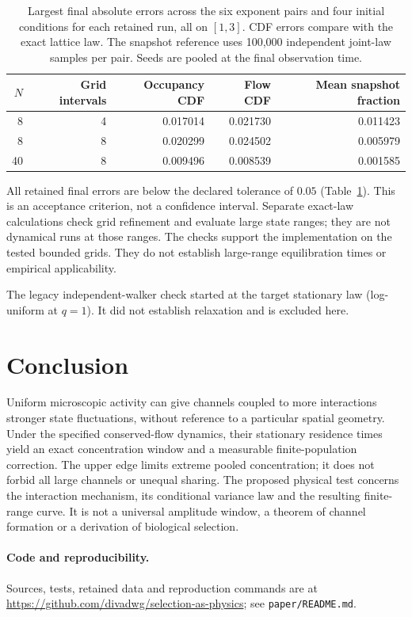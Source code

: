 \documentclass[11pt,a4paper]{article}
\begin{document}
\begin{table}[!ht]
\centering
\begin{tabular}{rrrrr}
\toprule
$N$ & Grid intervals & Occupancy CDF & Flow CDF & Mean snapshot fraction\\
\midrule
8 & 4 & 0.017014 & 0.021730 & 0.011423\\
8 & 8 & 0.020299 & 0.024502 & 0.005979\\
40 & 8 & 0.009496 & 0.008539 & 0.001585\\
\bottomrule
\end{tabular}
\caption{Largest final absolute errors across the six exponent pairs and four
initial conditions for each retained run, all on $[1,3]$. CDF errors compare
with the exact lattice law. The snapshot reference uses 100,000 independent
joint-law samples per pair. Seeds are pooled at the final observation time.}
\label{tab:checks}
\end{table}

All retained final errors are below the declared tolerance of $0.05$
(Table~\ref{tab:checks}). This is an acceptance criterion, not a confidence
interval. Separate exact-law calculations check grid refinement and evaluate
large state ranges; they are not dynamical runs at those ranges. The checks
support the implementation on the tested bounded grids. They do not establish
large-range equilibration times or empirical applicability.

The legacy independent-walker check started at the target stationary law
(log-uniform at $q=1$). It did not establish relaxation and is excluded here.

\section{Conclusion}

Uniform microscopic activity can give channels coupled to more interactions
stronger state fluctuations, without reference to a particular spatial geometry. Under the specified conserved-flow dynamics, their
stationary residence times yield an exact concentration window and a measurable
finite-population correction. The upper edge limits extreme pooled concentration;
it does not forbid all large channels or unequal sharing. The proposed physical
test concerns the interaction mechanism, its conditional variance law and the resulting
finite-range curve. It is not a universal amplitude window, a theorem of channel
formation or a derivation of biological selection.

\paragraph{Code and reproducibility.}
Sources, tests, retained data and reproduction commands are at
\url{https://github.com/divadwg/selection-as-physics}; see \texttt{paper/README.md}.
\end{document}
